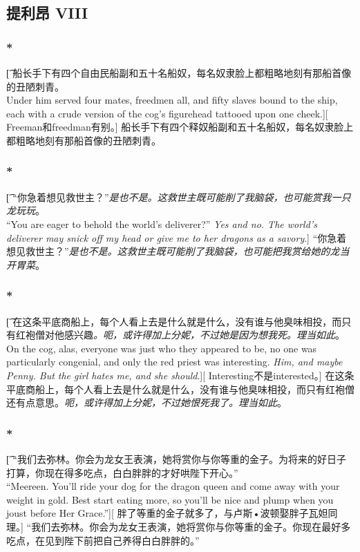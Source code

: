 \documentclass[12pt,a4paper]{article}
\begin{document}
\subsection{提利昂 VIII}
\subsubsection{\color{red}*}\t[
	船长手下有四个自由民船副和五十名船奴，每名奴隶脸上都粗略地刻有那船首像的丑陋刺青。\\
	Under him served four mates, freedmen all, and fifty slaves bound to the ship, each with a crude version of the cog's figurehead tattooed upon one cheek.][
	Freeman和freedman有别。]
	船长手下有四个释奴船副和五十名船奴，每名奴隶脸上都粗略地刻有那船首像的丑陋刺青。
	
\subsubsection{\color{red}*}\t[
	“你急着想见救世主？”\emph{是也不是。这救世主既可能削了我脑袋，也可能赏我一只龙玩玩}。\\
	“You are eager to behold the world's deliverer?” \emph{Yes and no. The world's deliverer may snick off my head or give me to her dragons as a savory}.]
	“你急着想见救世主？”\emph{是也不是。这救世主既可能削了我脑袋，也可能把我赏给她的龙当开胃菜}。
	
\subsubsection{\color{red}*}\t[
	在这条平底商船上，每个人看上去是什么就是什么，没有谁与他臭味相投，而只有红袍僧对他感兴趣\emph{。呃，或许得加上分妮，不过她是因为想我死。理当如此}。\\
	On the cog, alas, everyone was just who they appeared to be, no one was particularly congenial, and only the red priest was interesting. \emph{Him, and maybe Penny. But the girl hates me, and she should}.][
	Interesting不是interested。]
	在这条平底商船上，每个人看上去是什么就是什么，没有谁与他臭味相投，而只有红袍僧还有点意思。\emph{呃，或许得加上分妮，不过她恨死我了。理当如此}。
	
\subsubsection{\color{red}*}\t[
	“我们去弥林。你会为龙女王表演，她将赏你与你等重的金子。为将来的好日子打算，你现在得多吃点，白白胖胖的才好哄陛下开心。”\\
	“Meereen. You'll ride your dog for the dragon queen and come away with your weight in gold. Best start eating more, so you'll be nice and plump when you joust before Her Grace.”][
	胖了等重的金子就多了，与卢斯•波顿娶胖子瓦妲同理。]
	“我们去弥林。你会为龙女王表演，她将赏你与你等重的金子。你现在最好多吃点，在见到陛下前把自己养得白白胖胖的。”
\end{document}
